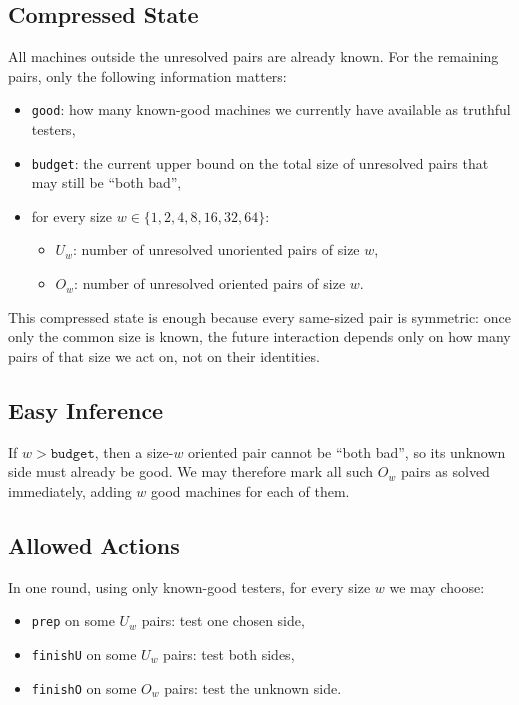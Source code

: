 \documentclass[11pt]{article}
\begin{document}
\subsection*{Compressed State}

All machines outside the unresolved pairs are already known. For the remaining pairs, only the following information matters:

\begin{itemize}[leftmargin=*]
    \item \texttt{good}: how many known-good machines we currently have available as truthful testers,
    \item \texttt{budget}: the current upper bound on the total size of unresolved pairs that may still be ``both bad'',
    \item for every size $w \in \{1,2,4,8,16,32,64\}$:
    \begin{itemize}[leftmargin=*]
        \item $U_w$: number of unresolved unoriented pairs of size $w$,
        \item $O_w$: number of unresolved oriented pairs of size $w$.
    \end{itemize}
\end{itemize}

This compressed state is enough because every same-sized pair is symmetric: once only the common size is known, the future interaction depends only on how many pairs of that size we act on, not on their identities.

\subsection*{Easy Inference}

If $w > \texttt{budget}$, then a size-$w$ oriented pair cannot be ``both bad'', so its unknown side must already be good. We may therefore mark all such $O_w$ pairs as solved immediately, adding $w$ good machines for each of them.

\subsection*{Allowed Actions}

In one round, using only known-good testers, for every size $w$ we may choose:

\begin{itemize}[leftmargin=*]
    \item \texttt{prep} on some $U_w$ pairs: test one chosen side,
    \item \texttt{finishU} on some $U_w$ pairs: test both sides,
    \item \texttt{finishO} on some $O_w$ pairs: test the unknown side.
\end{itemize}
\end{document}
